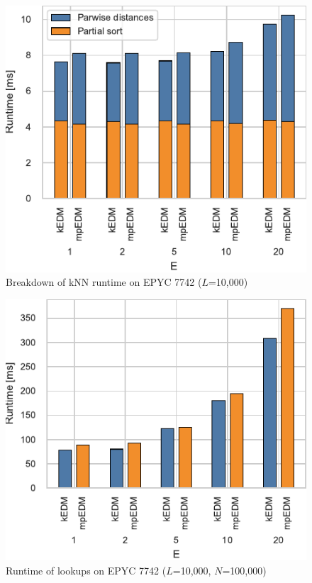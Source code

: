 \documentclass[conference]{IEEEtran}
\begin{document}
\begin{figure}
    \centering
    \includegraphics{figs/breakdown_knn_epyc}
    \caption{Breakdown of kNN runtime on EPYC 7742 ($L$=10,000)}%
    \label{fig:breakdown-knn-epyc}
\end{figure}

\begin{figure}
    \centering
    \includegraphics{figs/runtime_lookup_epyc}
    \caption{Runtime of lookups on EPYC 7742 ($L$=10,000, $N$=100,000)}%
    \label{fig:breakdown-lookup-epyc}
\end{figure}
\end{document}
